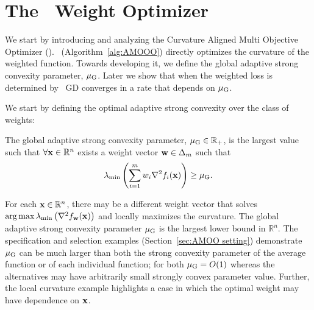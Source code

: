 \section{The \CAMOO\ Weight Optimizer}\label{sec:camoo}


We start by introducing and analyzing the Curvature Aligned Multi Objective Optimizer (\CAMOO). \CAMOO\ (Algorithm~\ref{alg:AMOOO}) directly optimizes the curvature of the weighted function.  Towards developing it, we define the global adaptive strong convexity parameter, ${\mu_{\mathrm{G}}}$. Later we show that when the weighted loss is determined by \CAMOO\ GD converges in a rate that depends on ${\mu_{\mathrm{G}}}$.

We start by defining the optimal adaptive strong convexity over the class of weights:
\begin{definition} \label{def:mu_global}
     The global adaptive strong convexity parameter, ${{\mu_{\mathrm{G}}}\in \mathbb{R}_{+}}$, is the largest value such that $\forall {\mathbf{x}}\in \mathbb{R}^n$ exists a weight vector ${\mathbf{w}}\in \Delta_m$ such that  
    \begin{align}
       \lambda_{\min}\left(\sum_{i=1}^m w_i \nabla^2 f_i({\mathbf{x}}) \right)\geq {\mu_{\mathrm{G}}}. \label{eq:mu_global_definition}
    \end{align}
\end{definition}

For each ${\mathbf{x}}\in \mathbb{R}^n$, there may be a different weight vector that solves $\arg\max\lambda_{\min}\left(\nabla^2 f_{\mathbf{w}}({\mathbf{x}}) \right)$ and locally maximizes the curvature. The global adaptive strong convexity parameter ${\mu_{\mathrm{G}}}$ is the largest lower bound in $\mathbb{R}^n.$ The specification and selection examples (Section~\ref{sec:AMOO setting}) demonstrate ${\mu_{\mathrm{G}}}$ can be much larger than both the strong convexity parameter of the average function or of each individual function; for both ${\mu_{\mathrm{G}}}=O(1)$ whereas the alternatives may have arbitrarily small strongly convex parameter value. Further, the local curvature example highlights a case in which the optimal weight may have dependence on ${\mathbf{x}}$.

